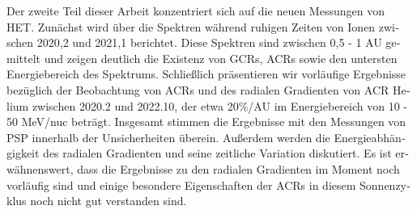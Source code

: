 \begin{otherlanguage}{ngerman}
    Der zweite Teil dieser Arbeit konzentriert sich auf die neuen Messungen von \ac{HET}. Zunächst wird über die Spektren während ruhigen Zeiten von Ionen zwischen 2020,2 und 2021,1 berichtet. Diese Spektren sind zwischen 0,5 - 1 AU gemittelt und zeigen deutlich die Existenz von \acp{GCR}, \acp{ACR} sowie den untersten Energiebereich des Spektrums. Schließlich präsentieren wir vorläufige Ergebnisse bezüglich der Beobachtung von \acp{ACR} und des radialen Gradienten von \ac{ACR} Helium zwischen 2020.2 und 2022.10, der etwa 20\%/AU im Energiebereich von 10 - 50 MeV/nuc beträgt. Insgesamt stimmen die Ergebnisse mit den Messungen von \ac{PSP} innerhalb der Unsicherheiten überein. Außerdem werden die Energieabhängigkeit des radialen Gradienten und seine zeitliche Variation diskutiert. Es ist erwähnenswert, dass die Ergebnisse zu den radialen Gradienten im Moment noch vorläufig sind und einige besondere Eigenschaften der ACRs in diesem Sonnenzyklus noch nicht gut verstanden sind.
    

\end{otherlanguage}